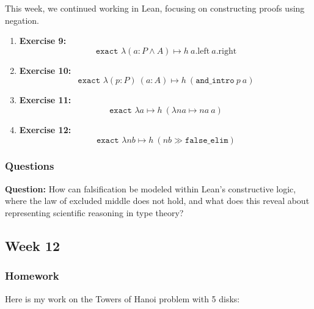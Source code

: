 \documentclass{article}
\theoremstyle{theorem}
\theoremstyle{definition}
\theoremstyle{remark}
\begin{document}
This week, we continued working in Lean, focusing on constructing proofs using negation.

\begin{enumerate}
\item \textbf{Exercise 9:} 
\[
\texttt{exact } \lambda (a : P \wedge A) \mapsto h\ a.\text{left}\ a.\text{right}
\]

\item \textbf{Exercise 10:} 
\[
\texttt{exact } \lambda (p : P)\ (a : A) \mapsto h\ (\texttt{and\_intro}\ p\ a)
\]

\item \textbf{Exercise 11:}
\[
\texttt{exact } \lambda a \mapsto h\ (\lambda na \mapsto na\ a)
\]

\item \textbf{Exercise 12:}
\[
\texttt{exact } \lambda nb \mapsto h\ (nb \gg \texttt{false\_elim})
\]
\end{enumerate}

\subsubsection{Questions}

\textbf{Question:} How can falsification be modeled within Lean’s constructive logic, where the law of excluded middle does not hold, and what does this reveal about representing scientific reasoning in type theory?

\subsection{Week 12}

\subsubsection{Homework}

Here is my work on the Towers of Hanoi problem with 5 disks:
\end{document}
